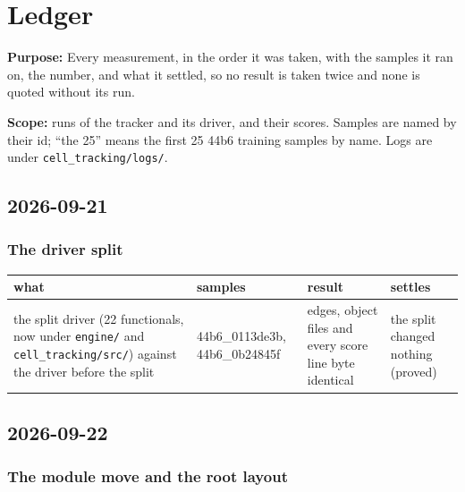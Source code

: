\chapter{\texorpdfstring{Ledger}{Ledger}}
\label{chap:ledger}

\textbf{Purpose:} Every measurement, in the order it was taken, with the samples it ran on, the number, and what it settled, so no result is taken twice and none is quoted without its run.

\textbf{Scope:} runs of the tracker and its driver, and their scores. Samples are named by their id; “the 25” means the first 25 44b6 training samples by name. Logs are under \texttt{cell\_\allowbreak{}tracking/\allowbreak{}logs/\allowbreak{}}.

\section{\texorpdfstring{2026-09-21}{2026-09-21}}

\subsection{\texorpdfstring{The driver split}{The driver split}}

{\footnotesize
\setlength{\tabcolsep}{6pt}
\begin{longtable}{>{\RaggedRight\arraybackslash}p{}>{\RaggedRight\arraybackslash}p{}>{\RaggedRight\arraybackslash}p{}>{\RaggedRight\arraybackslash}p{}}
\toprule
what & samples & result & settles \\
\midrule
\endhead
the split driver (22 functionals, now under \texttt{engine/\allowbreak{}} and \texttt{cell\_\allowbreak{}tracking/\allowbreak{}src/\allowbreak{}}) against the driver before the split & 44b6\_\allowbreak{}0113de3b, 44b6\_\allowbreak{}0b24845f & edges, object files and every score line byte identical & the split changed nothing (proved) \\
\bottomrule
\end{longtable}
}

\section{\texorpdfstring{2026-09-22}{2026-09-22}}

\subsection{\texorpdfstring{The module move and the root layout}{The module move and the root layout}}

